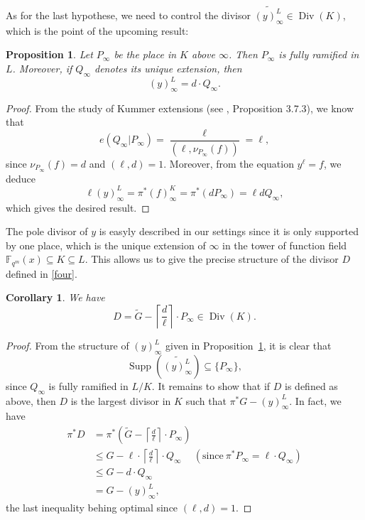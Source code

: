 \documentclass[10pt]{article}
\newtheorem{prop1}[thm]{Proposition}
\newtheorem{coro1}[thm]{Corollary}
\theoremstyle{definition}
\theoremstyle{definition}
\theoremstyle{definition}
\newcommand{\cd}{\cdot}
\newcommand{\Fqm}{\mathbb{F}_{q^m}}
\newcommand{\su}{\subseteq}
\newcommand{\Div}{\operatorname{Div}}
\newcommand{\Supp}{\operatorname{Supp}}
\begin{document}
As for the last hypothese, we need to control the divisor $\widetilde{(y)^L_{\infty}} \in \Div(K)$, which is the point of the upcoming result: 

\begin{prop1} \label{prop:div_pole_kummer}
Let $P_{\infty}$ be the place in $K$ above $\infty$. Then $P_{\infty}$ is fully ramified in $L$. Moreover, if $Q_{\infty}$ denotes its unique extension, then
\[(y)^L_{\infty} = d \cd Q_{\infty}.\] 
\end{prop1}

\begin{proof}
From the study of Kummer extensions (see \cite{Sti}, Proposition 3.7.3), we know that 
\[e(Q_{\infty}|P_{\infty})= \dfrac{\ell}{(\ell,\nu_{P_{\infty}}(f))} = \ell,\]
since $ \nu_{P_{\infty}}(f)=d$ and $(\ell,d)=1$. Moreover, from the equation $y^{\ell}=f$, we deduce 
\[ \ell (y)^L_{\infty} = \pi^* (f)^K_{\infty} = \pi^* (dP_{\infty}) = \ell d Q_{\infty},\]
which gives the desired result.
\end{proof}

The pole divisor of $y$ is easyly described in our settings since it is only supported by one place, which is the unique extension of $\infty$ in the tower of function field  $\Fqm(x) \su K \su L$.
This allows us to give the precise structure of the divisor $D$ defined in \eqref{four}.

\begin{coro1} \label{diviseurDKummer}
We have
\[D = \tilde{G} - \left\lceil\frac{d}{\ell}\right\rceil \cd P_{\infty} \in \Div(K).\]
\end{coro1}

\begin{proof}
From the structure of $(y)^L_{\infty}$ given in Proposition~\ref{prop:div_pole_kummer}, it is clear that 
\[\Supp\left(\widetilde{(y)^L_{\infty}}\right) \su \{P_{\infty}\},\]
since $Q_{\infty}$ is fully ramified in $L/K$. 
It remains to show that if $D$ is defined as above, then $D$ is the largest divisor in $K$ such that $\pi^* G - (y)^L_{\infty}$. In fact, we have
\begin{align*}
\pi^*D &= \pi^* \left(\tilde{G} - \left\lceil\frac{d}{\ell}\right\rceil \cd P_{\infty}\right) \\
&\leq G - \ell \cd \left\lceil\frac{d}{\ell}\right\rceil \cd Q_{\infty} \ \quad (\textrm{since} \ \pi^*P_{\infty} = \ell \cd Q_{\infty})\\
& \leq G - d \cd Q_{\infty} \\
&= G-(y)^L_{\infty},
\end{align*}
the last inequality behing optimal since $(\ell,d)=1$. 
\end{proof}
\end{document}
